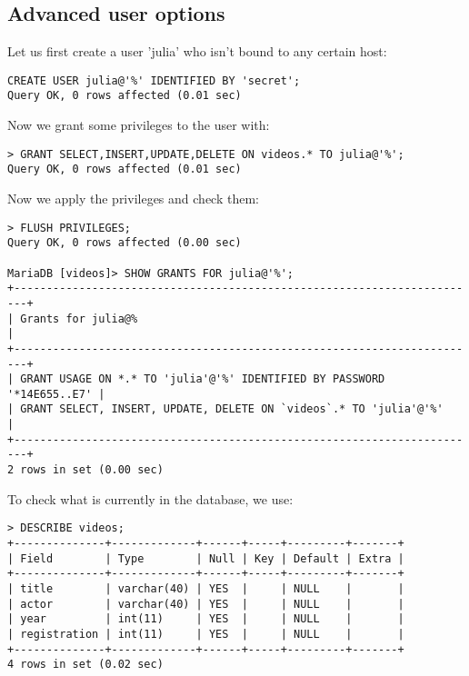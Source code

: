 \subsection{Advanced user options}
Let us first create a user 'julia' who isn't bound to any certain host:

\vspace{-15pt}
\begin{verbatim}
CREATE USER julia@'%' IDENTIFIED BY 'secret';
Query OK, 0 rows affected (0.01 sec)
\end{verbatim}
\vspace{-10pt}	

\noindent
Now we grant some privileges to the user with:

\vspace{-15pt}
\begin{verbatim}
> GRANT SELECT,INSERT,UPDATE,DELETE ON videos.* TO julia@'%';
Query OK, 0 rows affected (0.01 sec)
\end{verbatim}
\vspace{-10pt}	

\noindent
Now we apply the privileges and check them:

\vspace{-15pt}
\begin{verbatim}
> FLUSH PRIVILEGES;
Query OK, 0 rows affected (0.00 sec)

MariaDB [videos]> SHOW GRANTS FOR julia@'%';
+------------------------------------------------------------------------+
| Grants for julia@%                                                     |
+------------------------------------------------------------------------+
| GRANT USAGE ON *.* TO 'julia'@'%' IDENTIFIED BY PASSWORD '*14E655..E7' |
| GRANT SELECT, INSERT, UPDATE, DELETE ON `videos`.* TO 'julia'@'%'      |
+------------------------------------------------------------------------+
2 rows in set (0.00 sec)
\end{verbatim}
\vspace{-10pt}	

\noindent
To check what is currently in the database, we use:

\vspace{-15pt}
\begin{verbatim}
> DESCRIBE videos;
+--------------+-------------+------+-----+---------+-------+
| Field        | Type        | Null | Key | Default | Extra |
+--------------+-------------+------+-----+---------+-------+
| title        | varchar(40) | YES  |     | NULL    |       |
| actor        | varchar(40) | YES  |     | NULL    |       |
| year         | int(11)     | YES  |     | NULL    |       |
| registration | int(11)     | YES  |     | NULL    |       |
+--------------+-------------+------+-----+---------+-------+
4 rows in set (0.02 sec)
\end{verbatim}
\vspace{-10pt}	

